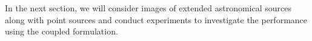 %
%
%
In the next section, we will consider images of extended astronomical sources along with point sources and conduct experiments to investigate the performance using the coupled formulation.


